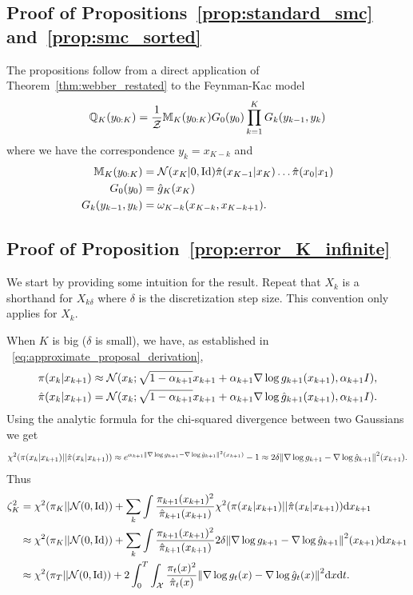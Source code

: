 \documentclass{article}
\theoremstyle{plain}
\theoremstyle{definition}
\theoremstyle{remark}
\begin{document}
\subsection{Proof of Propositions~\ref{prop:standard_smc} and~\ref{prop:smc_sorted}}
The propositions follow from a direct application of Theorem~\ref{thm:webber_restated} to the Feynman-Kac model
\begin{equation*}
	\mathbb{Q}_K(y_{0:K}) = \frac{1}{\mathcal Z} \mathbb M_K(y_{0:K}) G_0(y_0) \prod_{k=1}^K G_k(y_{k-1}, y_k)
\end{equation*}
where we have the correspondence $y_k = x_{K-k}$ and
\begin{align*}
	\mathbb M_K(y_{0:K})     & = \mathcal N(x_K|0, \operatorname{Id}) \hat \pi(x_{K-1}|x_K) \ldots \hat \pi(x_0|x_1) \\
	G_0(y_0)          & = \hat g_K(x_K)                                                                       \\
	G_k(y_{k-1}, y_k) & = \omega_{K-k}(x_{K-k}, x_{K-k+1}).
\end{align*}

\subsection{Proof of Proposition~\ref{prop:error_K_infinite}}
\label{sec:proof_error_K_inf}
We start by providing some intuition for the result. Repeat that $X_k$ is a shorthand for $X_{k\delta}$ where $\delta$ is the discretization step size. This convention only applies for $X_k$.

When $K$ is big ($\delta$ is small), we have, as established in ~\eqref{eq:approximate_proposal_derivation},
\begin{align*}
	\pi(x_k|x_{k+1})     & \approx \mathcal N(x_k; \sqrt{1-\alpha_{k+1}} x_{k+1} + \alpha_{k+1} \nabla\log g_{k+1}(x_{k+1}), \alpha_{k+1}I), \\
	\hat\pi(x_k|x_{k+1}) & = \mathcal N(x_k;\sqrt{1-\alpha_{k+1}} x_{k+1} + \alpha_{k+1} \nabla\log \hat g_{k+1}(x_{k+1}), \alpha_{k+1}I).
\end{align*}
Using the analytic formula for the chi-squared divergence between two Gaussians we get
\begin{align*}
	\chi^2(\pi(x_k|x_{k+1})||\hat\pi(x_k|x_{k+1})) \approx e^{\alpha_{k+1} \norm{\nabla\log g_{k+1} - \nabla\log \hat g_{k+1}}^2(x_{k+1})} - 1 \approx 2\delta \norm{\nabla\log g_{k+1} - \nabla\log \hat g_{k+1}}^2(x_{k+1}).
\end{align*}
Thus
\begin{align*}
	\zeta_{K}^2 & = \chi^2(\pi_K||\mathcal N(0, \operatorname{Id})) + \sum_k \int \frac{\pi_{k+1}(x_{k+1})^2}{\hat \pi_{k+1}(x_{k+1})} \chi^2(\pi(x_k|x_{k+1})||\hat\pi(x_k|x_{k+1})) \dd x_{k+1}                      \\
	            & \approx \chi^2(\pi_K||\mathcal N(0, \operatorname{Id})) + \sum_k \int \frac{\pi_{k+1}(x_{k+1})^2}{\hat \pi_{k+1}(x_{k+1})} 2\delta \norm{\nabla\log g_{k+1} - \nabla\log \hat g_{k+1}}^2(x_{k+1}) \dd x_{k+1} \\
	            & \approx \chi^2(\pi_T||\mathcal N(0, \operatorname{Id})) + 2\int_0^T \int_{\mathcal X} \frac{\pi_t(x)^2}{\hat \pi_t(x)} \norm{\nabla\log g_t(x) - \nabla\log \hat g_t(x)}^2 \dd x \dd t.
\end{align*}
\end{document}
